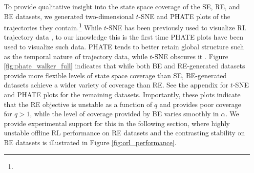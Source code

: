 %
To provide qualitative insight into the state space coverage of the SE, RE, and BE datasets, we generated two-dimensional $t$-SNE \citep{hinton2002stochastic} and PHATE \citep{moon2019visualizing} plots of the trajectories they contain.\footnote{  } 
%
%
While $t$-SNE has been previously used to visualize RL trajectory data \citep{zhang2021exploration}, to our knowledge this is the first time PHATE plots have been used to visualize such data. PHATE tends to better retain global structure such as the temporal nature of trajectory data, while $t$-SNE obscures it \citep{moon2019visualizing}. Figure \ref{fig:phate_walker_full} indicates that while both BE and RE-generated datasets provide more flexible levels of state space coverage than SE, BE-generated datasets achieve a wider variety of coverage than RE. See the appendix for $t$-SNE and PHATE plots for the remaining datasets. Importantly, these plots indicate that the RE objective is unstable as a function of $q$ and provides poor coverage for $q > 1$, while the level of coverage provided by BE varies smoothly in $\alpha$. We provide experimental support for this in the following section, where highly unstable offline RL performance on RE datasets and the contrasting stability on BE datasets is illustrated in Figure \ref{fig:orl_performance}.
%



